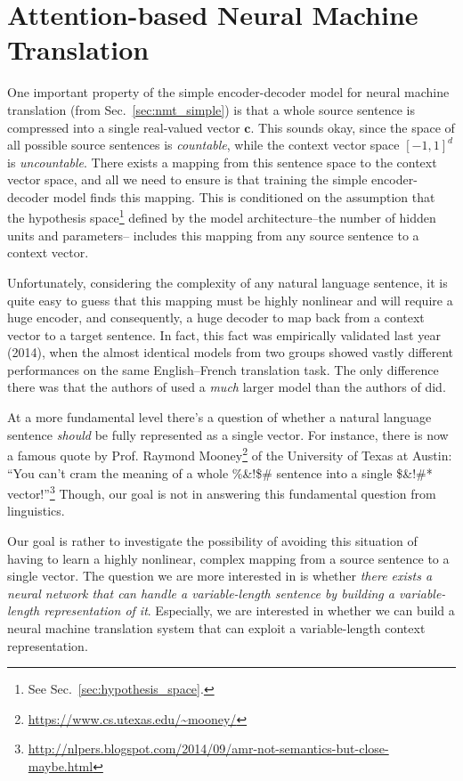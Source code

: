 \documentclass{report}
\newcommand{\vect}[1]{\mathbf{#1}}
\newcommand{\vc}[0]{\vect{c}}
\begin{document}
\section{Attention-based Neural Machine Translation}

One important property of the simple encoder-decoder model for neural machine
translation (from Sec.~\ref{sec:nmt_simple}) is that a whole source sentence is
compressed into a single real-valued vector $\vc$. This sounds okay, since the
space of all possible source sentences is {\em countable}, while the context
vector space $\left[ -1, 1 \right]^d$ is {\em uncountable}. There exists a
mapping from this sentence space to the context vector space, and all we need to
ensure is that training the simple encoder-decoder model finds this mapping.
This is conditioned on the assumption that the hypothesis space\footnote{
    See Sec.~\ref{sec:hypothesis_space}.
}
defined by the
model architecture--the number of hidden units and parameters-- includes this
mapping from any source sentence to a context vector.

Unfortunately, considering the complexity of any natural language sentence, it
is quite easy to guess that this mapping must be highly nonlinear and will require
a huge encoder, and consequently, a huge decoder to map back from a context
vector to a target sentence. In fact, this fact was empirically validated last
year (2014), when the almost identical models from two groups
\cite{sutskever2014sequence,cho2014properties} showed vastly different
performances on the same English--French translation task. The only difference
there was that the authors of \cite{sutskever2014sequence} used a {\em much}
larger model than the authors of \cite{cho2014properties} did.

At a more fundamental level there's a question of whether a natural language
sentence {\em should} be fully represented as a single vector. For instance,
there is now a famous quote by Prof. Raymond Mooney\footnote{
    \url{https://www.cs.utexas.edu/~mooney/}
} 
of the University of Texas at Austin: ``You can't cram the meaning of a whole
\%\&!\$\# sentence into a single \$\&!\#* vector!''\footnote{
    \url{http://nlpers.blogspot.com/2014/09/amr-not-semantics-but-close-maybe.html}
} Though, our goal is not in answering this fundamental question from
linguistics.

Our goal is rather to investigate the possibility of avoiding this situation of
having to learn a highly nonlinear, complex mapping from a source sentence to a
single vector. The question we are more interested in is whether {\em there
    exists a neural network that can handle a variable-length sentence by
building a variable-length representation of it}. Especially, we are interested
in whether we can build a neural machine translation system that can exploit a
variable-length context representation.
\end{document}
